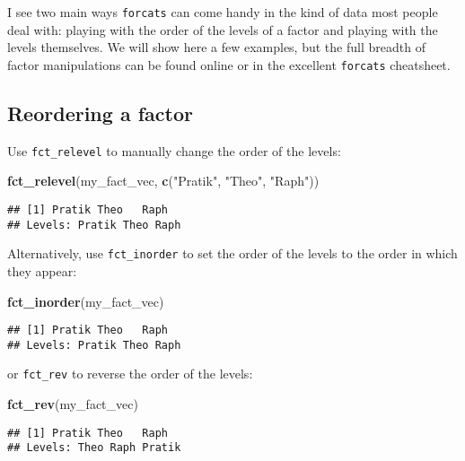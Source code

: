 \documentclass[
]{book}
\newenvironment{Shaded}{}{}
\newcommand{\KeywordTok}[1]{\textcolor[rgb]{0.00,0.44,0.13}{\textbf{#1}}}
\newcommand{\NormalTok}[1]{#1}
\newcommand{\StringTok}[1]{\textcolor[rgb]{0.25,0.44,0.63}{#1}}
\begin{document}
I see two main ways \texttt{forcats} can come handy in the kind of data most people deal with: playing with the order of the levels of a factor and playing with the levels themselves. We will show here a few examples, but the full breadth of factor manipulations can be found online or in the excellent \texttt{forcats} cheatsheet.

\hypertarget{reordering-a-factor}{%
\subsection{Reordering a factor}\label{reordering-a-factor}}

Use \texttt{fct\_relevel} to manually change the order of the levels:

\begin{Shaded}
\begin{Highlighting}[]
\KeywordTok{fct_relevel}\NormalTok{(my_fact_vec, }\KeywordTok{c}\NormalTok{(}\StringTok{"Pratik"}\NormalTok{, }\StringTok{"Theo"}\NormalTok{, }\StringTok{"Raph"}\NormalTok{))}
\end{Highlighting}
\end{Shaded}

\begin{verbatim}
## [1] Pratik Theo   Raph  
## Levels: Pratik Theo Raph
\end{verbatim}

Alternatively, use \texttt{fct\_inorder} to set the order of the levels to the order in which they appear:

\begin{Shaded}
\begin{Highlighting}[]
\KeywordTok{fct_inorder}\NormalTok{(my_fact_vec)}
\end{Highlighting}
\end{Shaded}

\begin{verbatim}
## [1] Pratik Theo   Raph  
## Levels: Pratik Theo Raph
\end{verbatim}

or \texttt{fct\_rev} to reverse the order of the levels:

\begin{Shaded}
\begin{Highlighting}[]
\KeywordTok{fct_rev}\NormalTok{(my_fact_vec)}
\end{Highlighting}
\end{Shaded}

\begin{verbatim}
## [1] Pratik Theo   Raph  
## Levels: Theo Raph Pratik
\end{verbatim}
\end{document}
